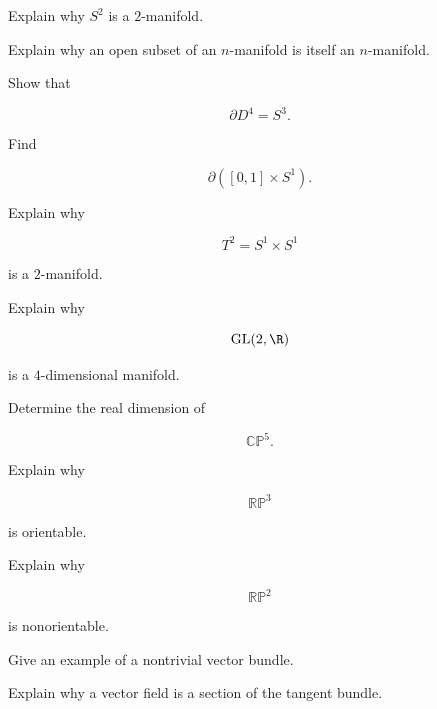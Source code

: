 \begin{exercise}[2]
Explain why \(S^2\) is a \(2\)-manifold.
\end{exercise}

\begin{exercise}[2]
Explain why an open subset of an \(n\)-manifold is itself an
\(n\)-manifold.
\end{exercise}

\begin{exercise}[2]
Show that

\[
\partial D^4=S^3.
\]
\end{exercise}

\begin{exercise}[2]
Find

\[
\partial([0,1]\times S^1).
\]
\end{exercise}

\begin{exercise}[2]
Explain why

\[
T^2=S^1\times S^1
\]

is a \(2\)-manifold.
\end{exercise}

\begin{exercise}[2]
Explain why

\[
\mathrm{GL}(2,\R)
\]

is a \(4\)-dimensional manifold.
\end{exercise}

\begin{exercise}[2]
Determine the real dimension of

\[
\mathbb{CP}^5.
\]
\end{exercise}

\begin{exercise}[2]
Explain why

\[
\mathbb{RP}^3
\]

is orientable.
\end{exercise}

\begin{exercise}[2]
Explain why

\[
\mathbb{RP}^2
\]

is nonorientable.
\end{exercise}

\begin{exercise}[2]
Give an example of a nontrivial vector bundle.
\end{exercise}

\begin{exercise}[2]
Explain why a vector field is a section of the tangent bundle.
\end{exercise}

